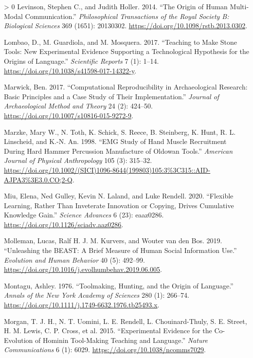 \documentclass[smallextended]{svjour3}       %
\newlength{\cslhangindent}
\newenvironment{CSLReferences}[3] %
 {%
  \setlength{\parindent}{0pt}
  \ifodd #1 \everypar{\setlength{\hangindent}{\cslhangindent}}\ignorespaces\fi
  \ifnum #2 > 0
  \setlength{\parskip}{#3\baselineskip}
  \fi
 }%
 {}
\begin{document}
\begin{CSLReferences}{1}{0}
\leavevmode\hypertarget{ref-levinson2014}{}%
Levinson, Stephen C., and Judith Holler. 2014. {``The Origin of Human
Multi-Modal Communication.''} \emph{Philosophical Transactions of the
Royal Society B: Biological Sciences} 369 (1651): 20130302.
\url{https://doi.org/10.1098/rstb.2013.0302}.

\leavevmode\hypertarget{ref-lombao2017}{}%
Lombao, D., M. Guardiola, and M. Mosquera. 2017. {``Teaching to Make
Stone Tools: New Experimental Evidence Supporting a Technological
Hypothesis for the Origins of Language.''} \emph{Scientific Reports} 7
(1): 1--14. \url{https://doi.org/10.1038/s41598-017-14322-y}.

\leavevmode\hypertarget{ref-marwick2017}{}%
Marwick, Ben. 2017. {``Computational Reproducibility in Archaeological
Research: Basic Principles and a Case Study of Their Implementation.''}
\emph{Journal of Archaeological Method and Theory} 24 (2): 424--50.
\url{https://doi.org/10.1007/s10816-015-9272-9}.

\leavevmode\hypertarget{ref-marzke1998}{}%
Marzke, Mary W., N. Toth, K. Schick, S. Reece, B. Steinberg, K. Hunt, R.
L. Linscheid, and K.-N. An. 1998. {``EMG Study of Hand Muscle
Recruitment During Hard Hammer Percussion Manufacture of Oldowan
Tools.''} \emph{American Journal of Physical Anthropology} 105 (3):
315--32.
\url{https://doi.org/10.1002/(SICI)1096-8644(199803)105:3\%3C315::AID-AJPA3\%3E3.0.CO;2-Q}.

\leavevmode\hypertarget{ref-miu2020}{}%
Miu, Elena, Ned Gulley, Kevin N. Laland, and Luke Rendell. 2020.
{``Flexible Learning, Rather Than Inveterate Innovation or Copying,
Drives Cumulative Knowledge Gain.''} \emph{Science Advances} 6 (23):
eaaz0286. \url{https://doi.org/10.1126/sciadv.aaz0286}.

\leavevmode\hypertarget{ref-molleman2019}{}%
Molleman, Lucas, Ralf H. J. M. Kurvers, and Wouter van den Bos. 2019.
{``Unleashing the BEAST: A Brief Measure of Human Social Information
Use.''} \emph{Evolution and Human Behavior} 40 (5): 492--99.
\url{https://doi.org/10.1016/j.evolhumbehav.2019.06.005}.

\leavevmode\hypertarget{ref-montagu1976}{}%
Montagu, Ashley. 1976. {``Toolmaking, Hunting, and the Origin of
Language.''} \emph{Annals of the New York Academy of Sciences} 280 (1):
266--74. \url{https://doi.org/10.1111/j.1749-6632.1976.tb25493.x}.

\leavevmode\hypertarget{ref-morgan2015}{}%
Morgan, T. J. H., N. T. Uomini, L. E. Rendell, L. Chouinard-Thuly, S. E.
Street, H. M. Lewis, C. P. Cross, et al. 2015. {``Experimental Evidence
for the Co-Evolution of Hominin Tool-Making Teaching and Language.''}
\emph{Nature Communications} 6 (1): 6029.
\url{https://doi.org/10.1038/ncomms7029}.


\end{CSLReferences}
\end{document}
